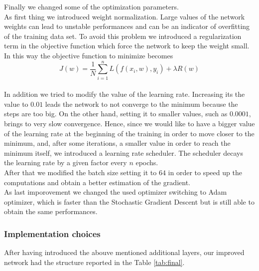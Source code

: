 \documentclass[12pt, a4paper]{report}
\begin{document}
Finally we changed some of the optimization parameters.\\
As first thing we introduced weight normalization. Large values of the network weights can lead to unstable performances and can be an indicator of overfitting of the training data set. To avoid this problem we introduced a regularization term in the objective function which force the network to keep the weight small. In this way the objective function to minimize becomes
$$J(w) = \frac 1 N \sum_{i=1}^n L(f(x_i, w), y_i) + \lambda R(w)$$\\
In addition we tried to modify the value of the learning rate. Increasing its the value to $0.01$ leads the network to not converge to the minimum because the steps are too big. On the other hand, setting it to smaller values, such as $0.0001$, brings to very slow convergence. Hence, since we would like to have a bigger value of the learning rate at the beginning of the training in order to move closer to the minimum, and, after some iterations, a smaller value in order to reach the minimum itself, we introduced a learning rate scheduler. The scheduler decays the learning rate by a given factor every $n$ epochs.\\
After that we modified the batch size setting it to $64$ in order to speed up the computations and obtain a better estimation of the gradient.\\
As last imporovement we changed the used optimizer switching to Adam optimizer, which is faster than the Stochastic Gradient Descent but is still able to obtain the same performances.

\subsubsection*{Implementation choices}

After having introduced the abouve mentioned additional layers, our improved network had the structure reported in the Table \ref{tab:final}.
\end{document}
